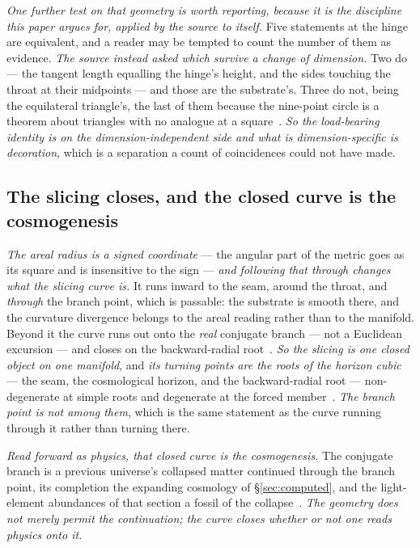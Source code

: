 \documentclass[11pt,a4paper]{article}
\theoremstyle{plain}
\theoremstyle{definition}
\begin{document}
\emph{One further test on that geometry is worth reporting, because it is the discipline this paper argues
for, applied by the source to itself.} Five statements at the hinge are equivalent, and a reader may be
tempted to count the number of them as evidence. \emph{The source instead asked which survive a change of
dimension.} Two do --- the tangent length equalling the hinge's height, and the sides touching the throat at
their midpoints --- and those are the substrate's. Three do not, being the equilateral triangle's, the last
of them because the nine-point circle is a theorem about triangles with no analogue at a
square~\cite{JanzenSlicing}. \emph{So the load-bearing identity is on the dimension-independent side and what
is dimension-specific is decoration}, which is a separation a count of coincidences could not have made.

\subsection{The slicing closes, and the closed curve is the cosmogenesis}

\emph{The areal radius is a signed coordinate} --- the angular part of the metric goes as its square and is
insensitive to the sign --- \emph{and following that through changes what the slicing curve is.} It runs
inward to the seam, around the throat, and \emph{through} the branch point, which is passable: the substrate
is smooth there, and the curvature divergence belongs to the areal reading rather than to the
manifold. Beyond it the curve runs out onto the \emph{real} conjugate branch --- not a Euclidean excursion ---
and closes on the backward-radial root~\cite{JanzenSlicing}. \emph{So the slicing is one closed object on one
manifold}, and \emph{its turning points are the roots of the horizon cubic} --- the seam, the cosmological
horizon, and the backward-radial root --- non-degenerate at simple roots and degenerate at the forced
member~\cite{JanzenSlicing}. \emph{The branch point is not among them}, which is the same statement as the
curve running through it rather than turning there.

\emph{Read forward as physics, that closed curve is the cosmogenesis.} The conjugate branch is a previous
universe's collapsed matter continued through the branch point, its completion the expanding cosmology of
\S\ref{sec:computed}, and the light-element abundances of that section a fossil of the
collapse~\cite{JanzenSlicing,JanzenCosmogenesis}. \emph{The geometry does not merely permit the continuation;
the curve closes whether or not one reads physics onto it.}
\end{document}

